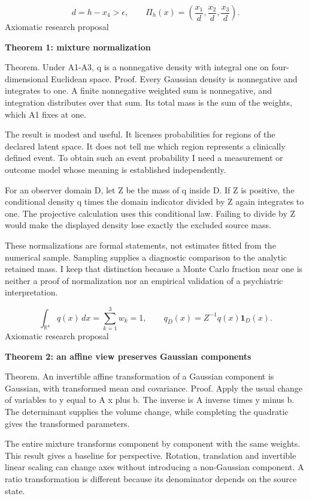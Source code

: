\documentclass[10pt]{article}
\begin{document}
\[d=h-x_4>\epsilon,\qquad\Pi_h(x)=\left(\frac{x_1}{d},\frac{x_2}{d},\frac{x_3}{d}\right).\]
\clearpage
{\small\color{accent}Axiomatic research proposal}\par
{\LARGE\bfseries\color{ink}Theorem 1: mixture normalization}\par\vspace{7pt}
Theorem. Under A1-A3, q is a nonnegative density with integral one on four-dimensional Euclidean space. Proof. Every Gaussian density is nonnegative and integrates to one. A finite nonnegative weighted sum is nonnegative, and integration distributes over that sum. Its total mass is the sum of the weights, which A1 fixes at one.\par
The result is modest and useful. It licenses probabilities for regions of the declared latent space. It does not tell me which region represents a clinically defined event. To obtain such an event probability I need a measurement or outcome model whose meaning is established independently.\par
For an observer domain D, let Z be the mass of q inside D. If Z is positive, the conditional density q times the domain indicator divided by Z again integrates to one. The projective calculation uses this conditional law. Failing to divide by Z would make the displayed density lose exactly the excluded source mass.\par
These normalizations are formal statements, not estimates fitted from the numerical sample. Sampling supplies a diagnostic comparison to the analytic retained mass. I keep that distinction because a Monte Carlo fraction near one is neither a proof of normalization nor an empirical validation of a psychiatric interpretation.\par
\[\int_{\mathbb R^4}q(x)\,dx=\sum_{k=1}^3w_k=1,\qquad q_D(x)=Z^{-1}q(x)\mathbf1_D(x).\]
\clearpage
{\small\color{accent}Axiomatic research proposal}\par
{\LARGE\bfseries\color{ink}Theorem 2: an affine view preserves Gaussian components}\par\vspace{7pt}
Theorem. An invertible affine transformation of a Gaussian component is Gaussian, with transformed mean and covariance. Proof. Apply the usual change of variables to y equal to A x plus b. The inverse is A inverse times y minus b. The determinant supplies the volume change, while completing the quadratic gives the transformed parameters.\par
The entire mixture transforms component by component with the same weights. This result gives a baseline for perspective. Rotation, translation and invertible linear scaling can change axes without introducing a non-Gaussian component. A ratio transformation is different because its denominator depends on the source state.\par
\end{document}
